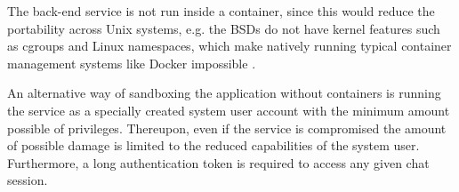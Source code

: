 The back-end service is not run inside a container, since this would reduce the portability across Unix systems, e.g. the BSDs do not have kernel features such as cgroups and Linux namespaces, which make natively running typical container management systems like Docker impossible \cite{Kerrisk2021}.

An alternative way of sandboxing the application without containers is running the service as a specially created system user account with the minimum amount possible of privileges. Thereupon, even if the service is compromised the amount of possible damage is limited to the reduced capabilities of the system user. Furthermore, a long authentication token is required to access any given chat session.